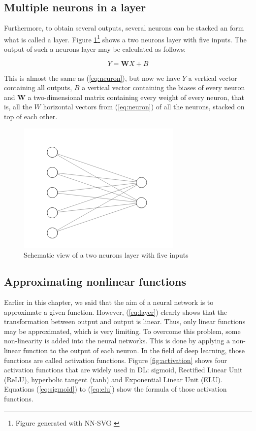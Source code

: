 \subsection{Multiple neurons in a layer}

Furthermore, to obtain several outputs, several neurons can be stacked an form what is called a layer. Figure \ref{fig:neurons layer}\footnote{Figure generated with NN-SVG \cite{nnsvg}} shows a two neurons layer with five inputs. The output of such a neurons layer may be calculated as follows: 

\begin{equation} \label{eq:layer}
    Y = \textbf{W}X + B
\end{equation}

This is almost the same as (\ref{eq:neuron}), but now we have $Y$ a vertical vector containing all outputs, $B$ a vertical vector containing the biases of every neuron and $\textbf{W}$ a two-dimensional matrix containing every weight of every neuron, that is, all the $W$ horizontal vectors from (\ref{eq:neuron}) of all the neurons, stacked on top of each other. 

\begin{figure}[h!]
    \centering
    \includegraphics[width=.6\textwidth]{images/neuron layer}
    \caption{Schematic view of a two neurons layer with five inputs}
    \label{fig:neurons layer}
\end{figure}

\subsection{Approximating nonlinear functions}

Earlier in this chapter, we said that the aim of a neural network is to approximate a given function. However, (\ref{eq:layer}) clearly shows that the transformation between output and output is linear. Thus, only linear functions may be approximated, which is very limiting. To overcome this problem, some non-linearity is added into the neural networks. This is done by applying a non-linear function to the output of each neuron. In the field of deep learning, those functions are called activation functions. Figure \ref{fig:activation} shows four activation functions that are widely used in DL: sigmoid, Rectified Linear Unit (ReLU), hyperbolic tangent (tanh) and Exponential Linear Unit (ELU). Equations (\ref{eq:sigmoid}) to (\ref{eq:elu}) show the formula of those activation functions.

